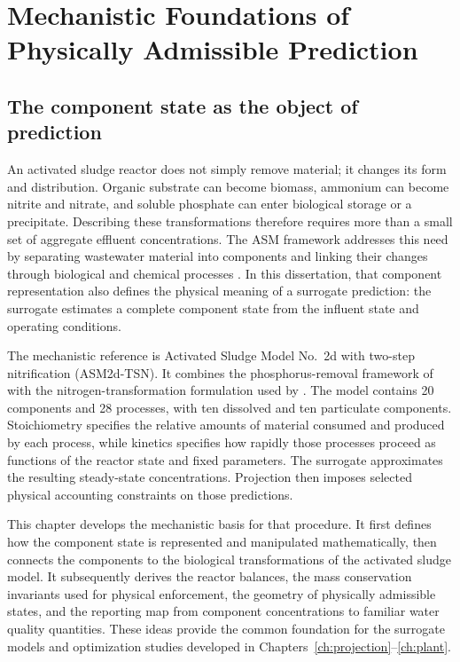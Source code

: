 \chapter{Mechanistic Foundations of Physically Admissible Prediction}
\label{ch:foundations}

\section{The component state as the object of prediction}

An activated sludge reactor does not simply remove material; it changes its form and distribution. Organic substrate can become biomass, ammonium can become nitrite and nitrate, and soluble phosphate can enter biological storage or a precipitate. Describing these transformations therefore requires more than a small set of aggregate effluent concentrations. The ASM framework addresses this need by separating wastewater material into components and linking their changes through biological and chemical processes \citep{Henze2006}. In this dissertation, that component representation also defines the physical meaning of a surrogate prediction: the surrogate estimates a complete component state from the influent state and operating conditions.

The mechanistic reference is Activated Sludge Model No.\ 2d with two-step nitrification (ASM2d-TSN). It combines the phosphorus-removal framework of \citet{Henze2006} with the nitrogen-transformation formulation used by \citet{Guerrero2011}. The model contains 20 components and 28 processes, with ten dissolved and ten particulate components. Stoichiometry specifies the relative amounts of material consumed and produced by each process, while kinetics specifies how rapidly those processes proceed as functions of the reactor state and fixed parameters. The surrogate approximates the resulting steady-state concentrations. Projection then imposes selected physical accounting constraints on those predictions.

This chapter develops the mechanistic basis for that procedure. It first defines how the component state is represented and manipulated mathematically, then connects the components to the biological transformations of the activated sludge model. It subsequently derives the reactor balances, the mass conservation invariants used for physical enforcement, the geometry of physically admissible states, and the reporting map from component concentrations to familiar water quality quantities. These ideas provide the common foundation for the surrogate models and optimization studies developed in Chapters~\ref{ch:projection}--\ref{ch:plant}.

